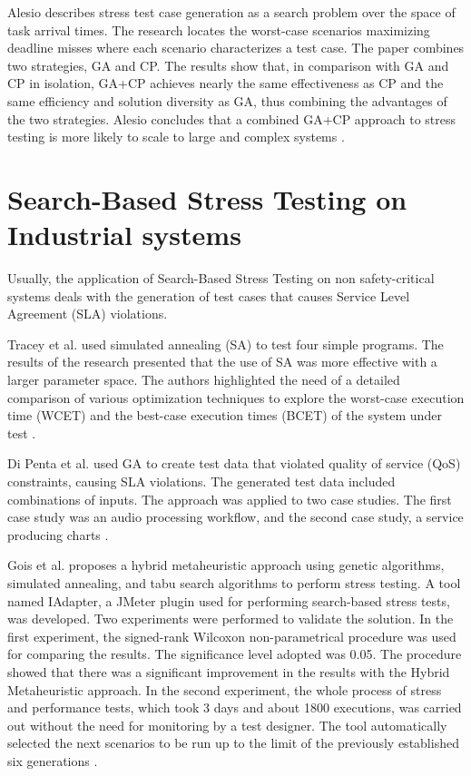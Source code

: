 \documentclass{report}
\begin{document}
Alesio describes stress test case generation as a search problem over the space of task arrival times. The research locates the  worst-case scenarios maximizing deadline misses where each scenario characterizes a test case. The paper combines two strategies, GA and CP. The results show that, in comparison with GA and CP in isolation, GA+CP achieves nearly the same effectiveness as CP and the same efficiency and solution diversity as GA, thus combining the advantages of the two strategies. Alesio concludes that a combined GA+CP approach to stress testing is more likely to scale to large and complex systems \cite{Alesio2015}.

\section{Search-Based Stress Testing on Industrial systems} 

Usually, the application of Search-Based Stress Testing on non safety-critical systems deals with the generation of test cases that causes Service Level Agreement (SLA) violations.


Tracey et al. \cite{Tracey1998} used simulated annealing (SA) to test four
simple programs. The results of the research presented that the use of SA was more effective with a larger parameter space. The authors highlighted the need of a detailed comparison of various optimization techniques to explore the worst-case execution time (WCET) and the best-case execution times (BCET) of the system under test \cite{Tracey1998}.

Di Penta et al. \cite{Penta2007} used GA to create test data that violated quality of service (QoS) constraints, causing SLA violations. The generated test data included combinations of inputs. The approach was applied to two case studies. The first case study was an audio processing workflow, and the second case study, a service producing charts \cite{Penta2007}.


Gois et al. proposes a hybrid metaheuristic approach using genetic algorithms, simulated annealing, and tabu search algorithms to perform stress testing. A tool named IAdapter, a JMeter plugin used for performing search-based stress tests, was developed. Two experiments were performed to validate the solution. In the first experiment, the signed-rank Wilcoxon non-parametrical procedure was used for comparing the results. The significance level adopted was 0.05. The procedure showed that there was a significant improvement in the results with the Hybrid Metaheuristic approach.
In the second experiment, the whole process of stress and performance tests, which took 3 days and about 1800 executions, was carried out without the need for monitoring by a test designer. The tool automatically selected the next scenarios to be run up to the limit of the previously established six generations \cite{Gois2016}. 
\end{document}
